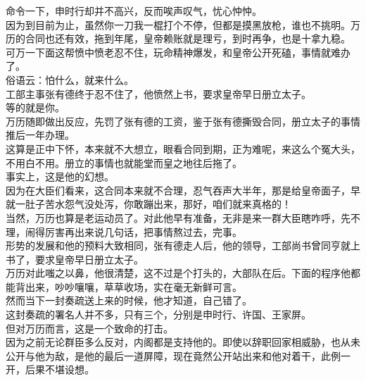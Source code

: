 \begin{multicols}{\theparacolNo}
命令一下，申时行却并不高兴，反而唉声叹气，忧心忡忡。\\

因为到目前为止，虽然你一刀我一棍打个不停，但都是摸黑放枪，谁也不挑明。万历的合同也还有效，拖到年尾，皇帝赖账就是理亏，到时再争，也是十拿九稳。\\

可万一下面这帮愤中愤老忍不住，玩命精神爆发，和皇帝公开死磕，事情就难办了。\\

俗语云：怕什么，就来什么。\\

工部主事张有德终于忍不住了，他愤然上书，要求皇帝早日册立太子。\\

等的就是你。\\

万历随即做出反应，先罚了张有德的工资，鉴于张有德撕毁合同，册立太子的事情推后一年办理。\\

这算是正中下怀，本来就不大想立，眼看合同到期，正为难呢，来这么个冤大头，不用白不用。册立的事情也就能堂而皇之地往后拖了。\\

事实上，这是他的幻想。\\

因为在大臣们看来，这合同本来就不合理，忍气吞声大半年，那是给皇帝面子，早就一肚子苦水怨气没处泻，你敢蹦出来，那好，咱们就来真格的！\\

当然，万历也算是老运动员了。对此他早有准备，无非是来一群大臣瞎咋呼，先不理，闹得厉害再出来说几句话，把事情熬过去，完事。\\

形势的发展和他的预料大致相同，张有德走人后，他的领导，工部尚书曾同亨就上书了，要求皇帝早日册立太子。\\

万历对此嗤之以鼻，他很清楚，这不过是个打头的，大部队在后。下面的程序他都能背出来，吵吵嚷嚷，草草收场，实在毫无新鲜可言。\\

然而当下一封奏疏送上来的时候，他才知道，自己错了。\\

这封奏疏的署名人并不多，只有三个，分别是申时行、许国、王家屏。\\

但对万历而言，这是一个致命的打击。\\

因为之前无论群臣多么反对，内阁都是支持他的。即使以辞职回家相威胁，也从未公开与他为敌，是他的最后一道屏障，现在竟然公开站出来和他对着干，此例一开，后果不堪设想。\\


\end{multicols}
